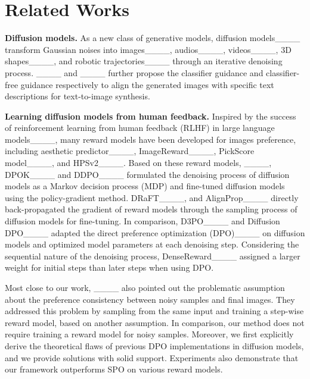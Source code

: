 \section{Related Works}
\label{sec: related_works}

\textbf{Diffusion models.}
As a new class of generative models, diffusion models____ transform Gaussian noises into images____, audios____, videos____, 3D shapes____, and robotic trajectories____ through an iterative denoising process.
____ and ____ further propose the classifier guidance and classifier-free guidance respectively to align the generated images with specific text descriptions for text-to-image synthesis.

\textbf{Learning diffusion models from human feedback.}
Inspired by the success of reinforcement learning from human feedback (RLHF) in large language models____, many reward models have been developed for images preference, including aesthetic predictor____, ImageReward____, PickScore model____, and HPSv2____.
Based on these reward models, ____, DPOK____ and DDPO____ formulated the denoising process of diffusion models as a Markov decision process (MDP) and fine-tuned diffusion models using the policy-gradient method.
DRaFT____, and AlignProp____ directly back-propagated the gradient of reward models through the sampling process of diffusion models for fine-tuning.
In comparison, D3PO____ and Diffusion DPO____ adapted the direct preference optimization (DPO)____ on diffusion models and optimized model parameters at each denoising step. 
Considering the sequential nature of the denoising process, DenseReward____ assigned a larger weight for initial steps than later steps when using DPO.

Most close to our work, ____ also pointed out the problematic assumption about the preference consistency between noisy samples and final images.
They addressed this problem by sampling from the same input and training a step-wise reward model, based on another assumption.
In comparison, our method does not require training a reward model for noisy samples.
Moreover, we first explicitly derive the theoretical flaws of previous DPO implementations in diffusion models, and we provide solutions with solid support.
Experiments also demonstrate that our framework outperforms SPO on various reward models.